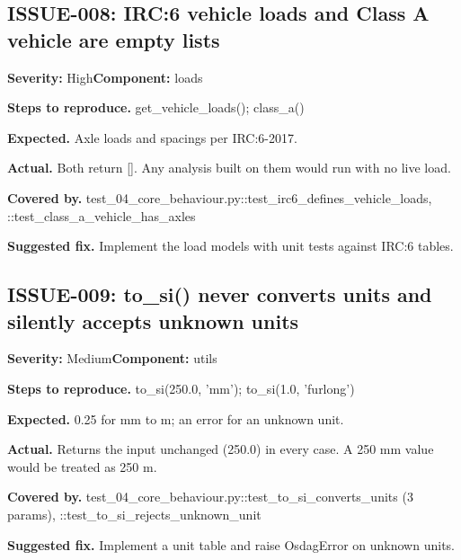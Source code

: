 \subsection*{ISSUE-008: IRC:6 vehicle loads and Class A vehicle are empty lists}
\textbf{Severity:} High\quad \textbf{Component:} loads\par
\textbf{Steps to reproduce.} get\_\allowbreak{}vehicle\_\allowbreak{}loads(); class\_\allowbreak{}a()\par
\textbf{Expected.} Axle loads and spacings per IRC:6-2017.\allowbreak{}\par
\textbf{Actual.} Both return [].\allowbreak{} Any analysis built on them would run with no live load.\allowbreak{}\par
\textbf{Covered by.} test\_\allowbreak{}04\_\allowbreak{}core\_\allowbreak{}behaviour.\allowbreak{}py::\allowbreak{}test\_\allowbreak{}irc6\_\allowbreak{}defines\_\allowbreak{}vehicle\_\allowbreak{}loads, ::\allowbreak{}test\_\allowbreak{}class\_\allowbreak{}a\_\allowbreak{}vehicle\_\allowbreak{}has\_\allowbreak{}axles\par
\textbf{Suggested fix.} Implement the load models with unit tests against IRC:6 tables.\allowbreak{}

\subsection*{ISSUE-009: to\_\allowbreak{}si() never converts units and silently accepts unknown units}
\textbf{Severity:} Medium\quad \textbf{Component:} utils\par
\textbf{Steps to reproduce.} to\_\allowbreak{}si(250.\allowbreak{}0, 'mm'); to\_\allowbreak{}si(1.\allowbreak{}0, 'furlong')\par
\textbf{Expected.} 0.\allowbreak{}25 for mm to m; an error for an unknown unit.\allowbreak{}\par
\textbf{Actual.} Returns the input unchanged (250.\allowbreak{}0) in every case.\allowbreak{} A 250 mm value would be treated as 250 m.\allowbreak{}\par
\textbf{Covered by.} test\_\allowbreak{}04\_\allowbreak{}core\_\allowbreak{}behaviour.\allowbreak{}py::\allowbreak{}test\_\allowbreak{}to\_\allowbreak{}si\_\allowbreak{}converts\_\allowbreak{}units (3 params), ::\allowbreak{}test\_\allowbreak{}to\_\allowbreak{}si\_\allowbreak{}rejects\_\allowbreak{}unknown\_\allowbreak{}unit\par
\textbf{Suggested fix.} Implement a unit table and raise OsdagError on unknown units.\allowbreak{}

